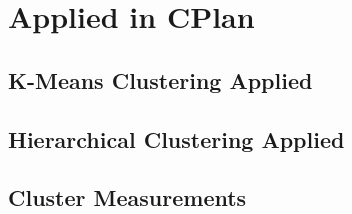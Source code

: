 \appendix
\chapter{Applied in CPlan}
\section{K-Means Clustering Applied}



\section{Hierarchical Clustering Applied}



\section{Cluster Measurements}



